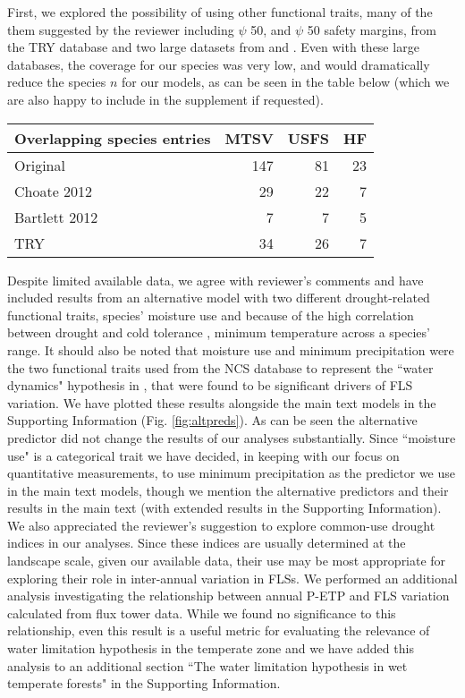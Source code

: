 \documentclass{article}[11pt]
\begin{document}
\noindent First, we explored the possibility of using other functional traits, many of the them suggested by the reviewer including $\psi$ 50, and $\psi$ 50 safety margins, from the TRY database and two large datasets from \citet{Bartlett2012} and \citet{Choat2012}. Even with these large databases, the coverage for our species was very low, and would dramatically reduce the species $n$ for our models, as can be seen in the table below (which we are also happy to include in the supplement if requested).\\

\begin{table}[ht]
\centering
\begin{tabular}{lrrr}
  \hline
  Overlapping species entries & MTSV & USFS & HF \\ 
  \hline
 Original & 147 &  81 &  23 \\ 
 Choate 2012 &  29 &  22 &   7 \\ 
 Bartlett 2012 &   7 &   7 &   5 \\ 
 TRY &  34 &  26 &   7 \\ 
   \hline
\end{tabular}
\end{table}

\noindent Despite limited available data, we agree with reviewer's comments and have included results from an alternative model with two different drought-related functional traits, species' moisture use and because of the high correlation between drought and cold tolerance \citep{Zanne2013}, minimum temperature across a species' range. It should also be noted that moisture use and minimum precipitation were the two functional traits used from the NCS database to represent the ``water dynamics" hypothesis in \citet{Gougherty2018}, that were found to be significant drivers of FLS variation. We have plotted these results alongside the main text models in the Supporting Information (Fig. \ref{fig:altpreds}). As can be seen the alternative predictor did not change the results of our analyses substantially. Since ``moisture use" is a categorical trait we have decided, in keeping with our focus on quantitative measurements, to use minimum precipitation as the predictor we use in the main text models, though we mention the alternative predictors and their results in the main text (with extended results in the Supporting Information).  \\

\noindent We also appreciated the reviewer's suggestion to explore common-use drought indices in our analyses. Since these indices are usually determined at the landscape scale, given our available data, their use may be most appropriate for exploring their role in inter-annual variation in FLSs. We performed an additional analysis investigating the relationship between annual P-ETP and FLS variation calculated from flux tower data. While we found no significance to this relationship, even this result is a useful metric for evaluating the relevance of water limitation hypothesis in the temperate zone  and we have added this analysis to an additional section ``The water limitation hypothesis in wet temperate forests" in the Supporting Information.\\
\end{document}
